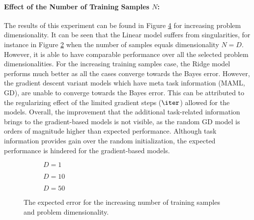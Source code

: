 \paragraph{Effect of the Number of Training Samples $N$:} The results of this experiment can be found in Figure \ref{fig:linear-N} for increasing problem dimensionality. It can be seen that the Linear model suffers from singularities, for instance in Figure \ref{fig:linear-N-D-10} when the number of samples equals dimensionality $N=D$. However, it is able to have comparable performance over all the selected problem dimensionalities. For the increasing training samples case, the Ridge model performs much better as all the cases converge towards the Bayes error. However, the gradient descent variant models which have meta task information (\eg MAML, GD), are unable to converge towards the Bayes error. This can be attributed to the regularizing effect of the limited gradient steps ($\iter$) allowed for the models. Overall, the improvement that the additional task-related information brings to the gradient-based models is not visible, as the random GD model is orders of magnitude higher than expected performance. Although task information provides gain over the random initialization, the expected performance is hindered for the gradient-based models.

\begin{figure}[!h]
  \centering
    \begin{subfigure}{0.3\textwidth}
      \centering
      \caption{$D=1$}
      \label{fig:linear-N-D-1}
    \end{subfigure}
    \begin{subfigure}{0.3\textwidth}
      \centering
      \caption{$D=10$}
      \label{fig:linear-N-D-10}
    \end{subfigure}
    \begin{subfigure}{0.3\textwidth}
      \centering
      \caption{$D=50$}
      \label{fig:linear-N-D-50}
    \end{subfigure}
  \caption{The expected error for the increasing number of training samples and problem dimensionality.}\label{fig:linear-N}
\end{figure}


